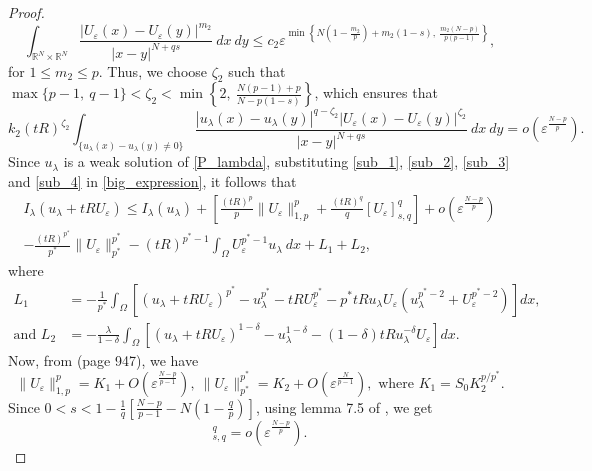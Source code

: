 \documentclass[reqno,oneside]{amsart}
\theoremstyle{definition}
\theoremstyle{remark}
\numberwithin{equation}{section}
\newcommand{\Om} {\Omega}
\newcommand{\sr}{\mathbb{R}}
\newcommand{\ue}{U_{\varepsilon}}
\newcommand{\la} {\lambda}
\begin{document}
\begin{proof}
    \[ \int_{\sr^N \times \sr^N} \frac{|\ue (x) - \ue (y)|^{m_2}}{|x-y|^{N+qs}}\ dx\ dy \leq c_2 \varepsilon^{\min \left\{N\left(1-\frac{m_2}{p}\right) + m_2 (1-s),\ \frac{m_2(N-p)}{p(p-1)} \right\}},\]
    for $1\leq m_2 \leq p$. Thus, we choose $\zeta_2$ such that $\max \{p-1,\ q-1 \} < \zeta_2 < \min \left\{ 2,\ \frac{N(p-1) +p}{N-p(1-s)} \right\}$, which ensures that
    \begin{equation}\label{sub_4}
        k_2 (tR)^{\zeta_2} \int_{\{u_{\la}(x) - u_{\la}(y) \not= 0\}} \frac{|u_{\la} (x) - u_{\la} (y)|^{q-\zeta_2} |\ue (x) - \ue (y)|^{\zeta_2}}{|x-y|^{N+qs}}\ dx\ dy = o\left( \varepsilon^{\frac{N-p}{p}} \right).
    \end{equation}
    Since $u_{\la}$ is a weak solution of \eqref{P_lambda}, substituting \eqref{sub_1}, \eqref{sub_2}, \eqref{sub_3} and \eqref{sub_4} in \eqref{big_expression}, it follows that
    \begin{multline}\label{big_expression_red_1}
        I_{\la} \left( u_{\la} + tR\ue\right) \leq I_{\la} (u_{\la}) + \left[ \frac{(tR)^p}{p} \|\ue\|^p_{1,p} + \frac{(tR)^q}{q} [\ue]^q_{s,q} \right] + o\left( \varepsilon^{\frac{N-p}{p}} \right)\\
        -\frac{(tR)^{p^*}}{p^*} \|\ue\|^{p^*}_{p^*} -(tR)^{p^* -1} \int_{\Om} \ue^{p^* -1} u_{\la}\ dx + L_1 + L_2,
    \end{multline}
    where
    \begin{align}
        L_1 &= -\frac{1}{p^*} \int_{\Om} \left[ (u_{\la} + tR \ue)^{p^*} - u_{\la}^{p^*} - tR \ue^{p^*} - p^* tR u_{\la} \ue \left( u_{\la}^{p^* -2} + \ue^{p^* -2} \right) \right] dx,\nonumber\\
        \text{and } L_2 &= -\frac{\la}{1-\delta} \int_{\Om} \left[ (u_{\la} + tR \ue)^{1-\delta} - u_{\la}^{1-\delta} - (1-\delta) tR u_{\la}^{-\delta} \ue \right] dx.\nonumber
    \end{align}
    Now, from \cite{garciaperal1994critical} (page 947), we have
    \begin{equation}
        \|\ue\|^p_{1,p} = K_1 + O \left(\varepsilon^{\frac{N-p}{p-1}} \right),\ \|\ue\|^{p^*}_{p^*} = K_2 + O \left(\varepsilon^{\frac{N}{p-1}} \right), \text{ where } K_1 = S_0 K_2^{p/p^*}.
    \end{equation}
    Since $0<s< 1- \frac{1}{q} \left[ \frac{N-p}{p-1} - N \left( 1- \frac{q}{p} \right) \right]$, using lemma 7.5 of \cite{dhanya2025multiplicityresultsmixedlocal}, we get
    \begin{equation}
        [\ue]^q_{s,q} = o\left( \varepsilon^{\frac{N-p}{p}} \right).

\end{equation}
\end{proof}
\end{document}
